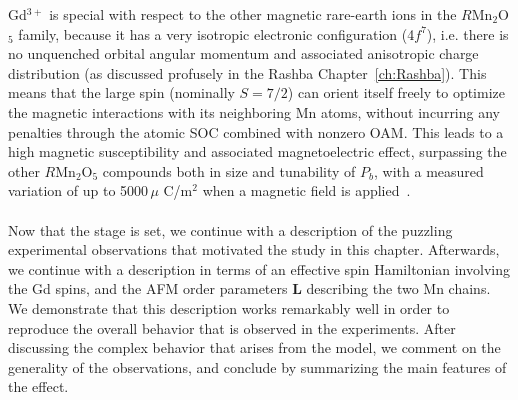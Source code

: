Gd$^{3+}$ is special with respect to the other magnetic rare-earth ions in the $R$Mn$_2$O$_5$ family, because it has a very isotropic electronic configuration (4$f^7$), i.e. there is no unquenched orbital angular momentum and associated anisotropic charge distribution (as discussed profusely in the Rashba Chapter~\ref{ch:Rashba}). This means that the large spin (nominally $S=7/2$) can orient itself freely to optimize the magnetic interactions with its neighboring Mn atoms, without incurring any penalties through the atomic SOC combined with nonzero OAM.
This leads to a high magnetic susceptibility and associated magnetoelectric effect, surpassing the other $R$Mn$_2$O$_5$ compounds both in size and tunability of $P_b$, with a measured variation of up to 5000\,$\mu$ C/m$^2$ when a magnetic field is applied~\cite{Lee13}. 
\\\\
Now that the stage is set, we continue with a description of the puzzling experimental observations that motivated the study in this chapter.
Afterwards, we continue with a description in terms of an effective spin Hamiltonian involving the Gd spins, and the AFM order parameters $\bm L$ describing the two Mn chains.
We demonstrate that this description works remarkably well in order to reproduce the overall behavior that is observed in the experiments.
After discussing the complex behavior that arises from the model, we comment on the generality of the observations, and conclude by summarizing the main features of the effect. 

